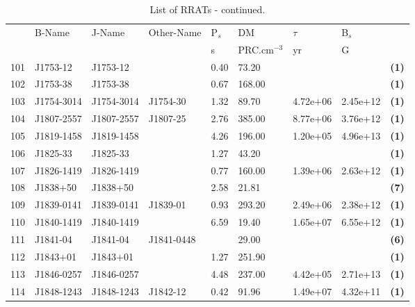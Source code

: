 \documentclass{jaa}
\begin{document}
%
\begin{table*} 
%
\caption{List of RRATs - continued.}
%
\label{t_list03}
%  
\begin{minipage}{0.95\textwidth}
%
\centering
\begin{tabular}{|l|l|l|l|l|l|l|l|l|} \toprule
     &  B-Name     & J-Name      & Other-Name  & P$_s$ &  DM    &  $\tau$    & B$_s$    &        \\
     &             &             &             &  s    & PRC.cm$^{-3}$ & yr    & G        &        \\ \midrule
 101 & J1753-12    & J1753-12    &             &  0.40 &  73.20 &            &          &  {\bf (1)}   \\ 
 102 & J1753-38    & J1753-38    &             &  0.67 & 168.00 &            &          &  {\bf (1)}   \\
 103 & J1754-3014  & J1754-3014  &  J1754-30   &  1.32 &  89.70 &  4.72e+06  & 2.45e+12 &  {\bf (1)}   \\
 104 & J1807-2557  & J1807-2557  &  J1807-25   &  2.76 & 385.00 &  8.77e+06  & 3.76e+12 &  {\bf (1)}   \\
 105 & J1819-1458  & J1819-1458  &             &  4.26 & 196.00 &  1.20e+05  & 4.96e+13 &  {\bf (1)}   \\
 106 & J1825-33    & J1825-33    &             &  1.27 &  43.20 &            &          &  {\bf (1)}   \\
 107 & J1826-1419  & J1826-1419  &             &  0.77 & 160.00 &  1.39e+06  & 2.63e+12 &  {\bf (1)}   \\
 108 & J1838+50    & J1838+50    &             &  2.58 &  21.81 &            &          &  {\bf (7)}   \\
 109 & J1839-0141  & J1839-0141  &  J1839-01   &  0.93 & 293.20 &  2.49e+06  & 2.38e+12 &  {\bf (1)}   \\
 110 & J1840-1419  & J1840-1419  &             &  6.59 &  19.40 &  1.65e+07  & 6.55e+12 &  {\bf (1)}   \\
 111 & J1841-04    & J1841-04    & J1841-0448  &       &  29.00 &            &          &  {\bf (6)}   \\
 112 & J1843+01    & J1843+01    &             &  1.27 & 251.90 &            &          &  {\bf (1)}   \\
 113 & J1846-0257  & J1846-0257  &             &  4.48 & 237.00 &  4.42e+05  & 2.71e+13 &  {\bf (1)}   \\
 114 & J1848-1243  & J1848-1243  &  J1842-12   &  0.42 &  91.96 &  1.49e+07  & 4.32e+11 &  {\bf (1)}   \\

\end{tabular}
\end{minipage}
\end{table*}
\end{document}
